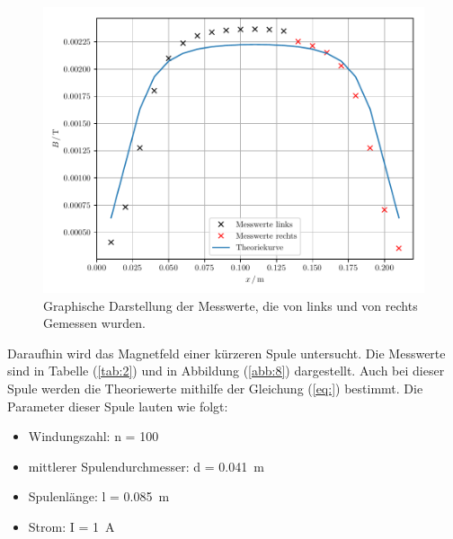 \begin{figure}[H]
  \centering
  \includegraphics{plot1.pdf}
  \caption{Graphische Darstellung der Messwerte, die von links und von rechts Gemessen wurden.}
  \label{abb:7}
\end{figure}


Daraufhin wird das Magnetfeld einer kürzeren Spule untersucht. Die Messwerte sind in
Tabelle (\ref{tab:2}) und in Abbildung (\ref{abb:8}) dargestellt. Auch bei dieser
Spule werden die Theoriewerte mithilfe der Gleichung (\ref{eq:}) bestimmt. Die
Parameter dieser Spule lauten wie folgt:

\begin{itemize}
  \item Windungszahl: n = 100
  \item mittlerer Spulendurchmesser: d = \SI{0.041}{\meter}
  \item Spulenlänge: l = \SI{0.085}{\meter}
  \item Strom: I = \SI{1}{\ampere}
\end{itemize}

